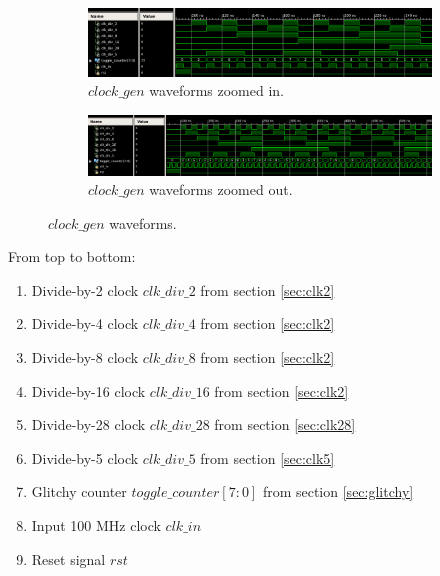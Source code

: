 \documentclass{article}
\begin{document}
\begin{figure}[H]
    \centering
    \begin{subfigure}{\textwidth}
        \includegraphics[scale=0.41]{../figs/clock_gen.png}
        \caption{$clock\_gen$ waveforms zoomed in.}
        \label{fig:clkgen1}
    \end{subfigure}
    \begin{subfigure}{\textwidth}
        \includegraphics[scale=0.37]{../figs/clock_gen_zoom_out.png}
        \caption{$clock\_gen$ waveforms zoomed out.}
        \label{fig:clkgen2}
    \end{subfigure}
    \caption{$clock\_gen$ waveforms.}
    \label{fig:clkgen}
\end{figure}


\noindent From top to bottom:
\begin{enumerate}
    \item Divide-by-2 clock $clk\_div\_2$ from section \ref{sec:clk2}
    \item Divide-by-4 clock $clk\_div\_4$ from section \ref{sec:clk2}
    \item Divide-by-8 clock $clk\_div\_8$ from section \ref{sec:clk2}
    \item Divide-by-16 clock $clk\_div\_16$ from section \ref{sec:clk2}
    \item Divide-by-28 clock $clk\_div\_28$ from section \ref{sec:clk28}
    \item Divide-by-5 clock $clk\_div\_5$ from section \ref{sec:clk5}
    \item Glitchy counter $toggle\_counter[7:0]$ from section \ref{sec:glitchy}
    \item Input 100 MHz clock $clk\_in$
    \item Reset signal $rst$
\end{enumerate}
\end{document}
